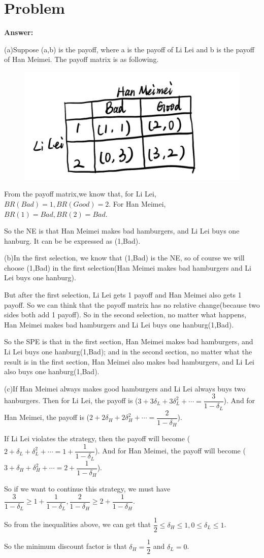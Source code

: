 \documentclass[a4 paper,12pt]{article}
\begin{document}
\section{Problem}
\noindent
\textbf{Answer:}
\par(a)Suppose (a,b) is the payoff, where a is the payoff of Li Lei and b is the payoff of Han Meimei. The payoff matrix is as following.
	\begin{figure}[H]
	\centering
	\hspace{2em}\includegraphics[width=.5\linewidth]{pic/1.jpg}
\end{figure}
\par From the payoff matrix,we know that, for Li Lei, $BR(Bad)=1,BR(Good)=2$. For Han Meimei, $BR(1)=Bad,BR(2)=Bad$.
\par So the NE is that Han Meimei makes bad hamburgers, and Li Lei buys one hanburg. It can be be expressed as (1,Bad).
\par (b)In the first selection, we know that (1,Bad) is the NE, so of course we will choose (1,Bad) in the first selection(Han Meimei makes bad hamburgers and Li Lei buys one hanburg).
\par But after the first selection, Li Lei gets 1 payoff and Han Meimei also gets 1 payoff. So we can think that the payoff matrix has no relative change(because two sides both add 1 payoff). So in the second selection, no matter what happens, Han Meimei makes bad hamburgers and Li Lei buys one hanburg(1,Bad). 
\par So the SPE is that in the first section, Han Meimei makes bad hamburgers, and Li Lei buys one hanburg(1,Bad); and in the second section, no matter what the result is in the first section, Han Meimei also makes bad hamburgers, and Li Lei also buys one hanburg(1,Bad).
\par (c)If Han Meimei always makes good hamburgers and Li Lei always buys two hanburgers. Then for Li Lei, the payoff is ($3+3\delta_{L}+3\delta_{L}^{2}+\cdots=\dfrac{3}{1-\delta_{L}}$). And for Han Meimei, the payoff is ($2+2\delta_{H}+2\delta_{H}^{2}+\cdots=\dfrac{2}{1-\delta_{H}}$).
\par If Li Lei violates the strategy, then the payoff will become ($2+\delta_{L}+\delta_{L}^{2}+\cdots=1+\dfrac{1}{1-\delta_{L}}$). And for Han Meimei, the payoff will become ($3+\delta_{H}+\delta_{H}^{2}+\cdots=2+\dfrac{1}{1-\delta_{H}}$).
\par So if we want to continue this strategy, we must have $\dfrac{3}{1-\delta_{L}}\ge 1+\dfrac{1}{1-\delta_{L}},\dfrac{2}{1-\delta_{H}}\ge 2+\dfrac{1}{1-\delta_{H}}$.
\par So from the inequalities above, we can get that $\dfrac{1}{2}\le \delta_{H}\le 1,0\le \delta_{L}\le 1$. 
\par So the minimum discount factor is that $\delta_{H}=\dfrac{1}{2}$ and $\delta_{L}=0$.
\end{document}
